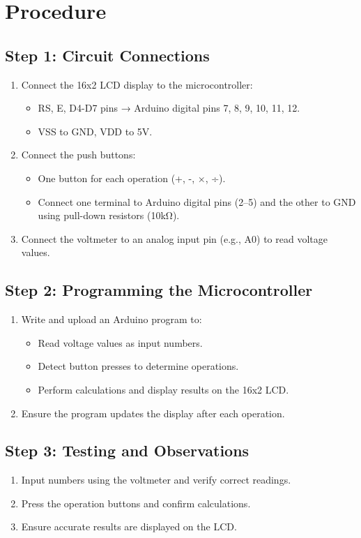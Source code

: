 \documentclass[a4paper,12pt]{article}
\begin{document}
\section{Procedure}

\subsection{Step 1: Circuit Connections}
\begin{enumerate}
    \item Connect the {16x2 LCD display} to the microcontroller:
    \begin{itemize}
        \item RS, E, D4-D7 pins → Arduino digital pins 7, 8, 9, 10, 11, 12.
        \item VSS to {GND}, VDD to {5V}.
    \end{itemize}
    \item Connect the {push buttons}:
    \begin{itemize}
        \item One button for each operation (+, -, ×, ÷).
        \item Connect one terminal to Arduino digital pins (2–5) and the other to GND using pull-down resistors (10kΩ).
    \end{itemize}
    \item Connect the {voltmeter} to an analog input pin (e.g., A0) to read voltage values.
\end{enumerate}
\subsection{Step 2: Programming the Microcontroller}
\begin{enumerate}
    \item Write and upload an Arduino program to:
    \begin{itemize}
        \item Read voltage values as input numbers.
        \item Detect button presses to determine operations.
        \item Perform calculations and display results on the 16x2 LCD.
    \end{itemize}
    \item Ensure the program updates the display after each operation.
\end{enumerate}

\subsection{Step 3: Testing and Observations}
\begin{enumerate}
    \item Input numbers using the voltmeter and verify correct readings.
    \item Press the operation buttons and confirm calculations.
    \item Ensure accurate results are displayed on the LCD.
\end{enumerate}
\end{document}
